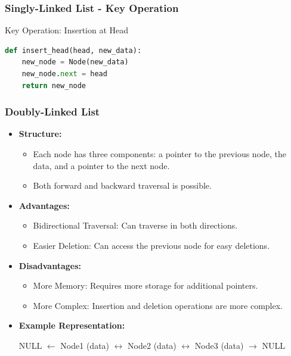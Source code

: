 \documentclass{beamer}
\begin{document}
\begin{frame}[fragile]
    \frametitle{Singly-Linked List - Key Operation}
    \begin{block}{Key Operation: Insertion at Head}
        \begin{lstlisting}[language=Python]
def insert_head(head, new_data):
    new_node = Node(new_data)
    new_node.next = head
    return new_node
        \end{lstlisting}
    \end{block}
\end{frame}

\begin{frame}[fragile]
    \frametitle{Doubly-Linked List}
    \begin{itemize}
        \item \textbf{Structure:}
        \begin{itemize}
            \item Each node has three components: a pointer to the previous node, the data, and a pointer to the next node.
            \item Both forward and backward traversal is possible.
        \end{itemize}
        
        \item \textbf{Advantages:}
        \begin{itemize}
            \item Bidirectional Traversal: Can traverse in both directions.
            \item Easier Deletion: Can access the previous node for easy deletions.
        \end{itemize}
        
        \item \textbf{Disadvantages:}
        \begin{itemize}
            \item More Memory: Requires more storage for additional pointers.
            \item More Complex: Insertion and deletion operations are more complex.
        \end{itemize}
        
        \item \textbf{Example Representation:}
        \begin{center}
            NULL $\leftarrow$ Node1 (data) $\leftrightarrow$ Node2 (data) $\leftrightarrow$ Node3 (data) $\rightarrow$ NULL
        \end{center}
    \end{itemize}
\end{frame}
\end{document}
